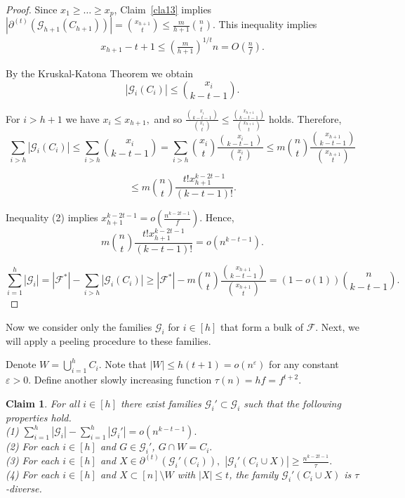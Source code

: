 \documentclass[12pt,a4paper]{article}
\newcommand{\ff}{\mathcal{F}}
\newcommand{\cG}{\mathcal{G}}
\newtheorem{Claim}[Theorem]{Claim}
\begin{document}
\begin{proof}

Since $x_1 \geqslant \ldots \geqslant x_p$, Claim~\ref{cla13} implies $ |\partial^{(t)}(\mathcal{G}_{h+1}(C_{h+1}))|  =  \binom{x_{h+1}}{t}  \leqslant \frac{m}{h+1} \binom{n}{t}.$ This inequality implies 
\begin{align}
x_{h+1} - t + 1 \leqslant\left(\frac{m}{h+1}\right)^{1/t} n = O\left(\frac{n}{f}\right).
\end{align}

By the Kruskal-Katona Theorem we obtain
$$|\mathcal{G}_i(C_i)| \leqslant\binom{x_i}{k-t-1}.$$

For $i > h+1$ we have $x_i \leqslant x_{h+1},$ and so $ \frac{\binom{x_{i}}{k-t-1}}{\binom{x_{i}}{t}} \leqslant \frac{\binom{x_{h+1}}{k-t-1}}{\binom{x_{h+1}}{t}}$ holds. Therefore, 
$$\sum_{i>h} |\mathcal{G}_i(C_i)| \leqslant\sum_{i>h} \binom{x_i}{k-t-1} = \sum_{i>h} \binom{x_i}{t} \frac{\binom{x_i}{k-t-1}}{\binom{x_i}{t}} \leqslant m \binom{n}{t} \frac{\binom{x_{h+1}}{k-t-1}}{\binom{x_{h+1}}{t}}$$

$$\leqslant m \binom{n}{t} \frac{t!x_{h+1}^{k-2t-1}}{(k-t-1)!}.$$

Inequality (2) implies $x_{h+1}^{k-2t-1} = o(\frac{n^{k-2t-1}}{f}).$ Hence,
$$ m \binom{n}{t} \frac{t!x_{h+1}^{k-2t-1}}{(k-t-1)!} = o(n^{k-t-1}).$$

$$\sum_{i=1}^h|\mathcal{G}_i| = |\ff^*| - \sum_{i>h} |\mathcal{G}_i(C_i)| \geqslant |\ff^*| - m \binom{n}{t} \frac{\binom{x_{h+1}}{k-t-1}}{\binom{x_{h+1}}{t}} = (1-o(1))\binom{n}{k-t-1}.$$

\end{proof}

Now we consider only the families $\mathcal{G}_i$ for $i \in [h]$ that form a bulk of $\mathcal{F}$. Next, we will apply a peeling procedure to these families. 

Denote $W = \bigcup_{i=1}^h C_i$. Note that $|W| \leqslant h(t+1) = o(n^\varepsilon)$ for any constant $\varepsilon>0$. Define another slowly increasing function $\tau(n) = hf = f^{t+2}.$

\begin{Claim}\label{peel}  For all $i \in [h]$ there exist families $\mathcal{G}_i' \subset  \mathcal{G}_i$ such that the following properties hold.\\
(1) $\sum_{i=1}^h |\mathcal{G}_i| - \sum_{i=1}^h |\mathcal{G}_i'| = o(n^{k-t-1}).$\\
(2) For each $i \in [h]$ and $G \in \mathcal{G}_i'$, $G \cap W = C_i.$\\
(3) For each $i \in [h]$ and $X \in \partial^{(t)}(\cG_i'(C_i)),$ $|\cG_i'(C_i \cup X)| \geqslant \frac{n^{k-2t-1}}{\tau}.$\\
(4) For each $i \in [h]$ and $X \subset [n] \setminus W$ with $|X| \leqslant t$, the family $\mathcal{G}_i'(C_i \cup X)$ is $\tau$-diverse.

\end{Claim}
\end{document}
